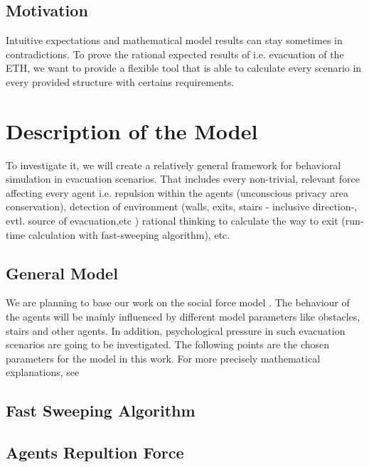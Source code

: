 \documentclass[11pt]{article}
\begin{document}
\subsection{Motivation}

Intuitive expectations and mathematical model results can stay sometimes in contradictions. To prove the rational expected results of i.e. evacuation of the ETH, we want to provide a flexible tool that is able to calculate every scenario in every provided structure with certains requirements.

\section{Description of the Model}


To investigate it, we will create a relatively general framework for behavioral simulation in evacuation scenarios. That includes every non-trivial, relevant force affecting every agent i.e. repulsion within the agents (unconscious privacy area conservation), detection of environment (walls, exits, stairs - inclusive direction-, evtl. source of evacuation,etc ) rational thinking to calculate the way to exit (run-time calculation with fast-sweeping algorithm), etc.


\subsection{General Model}

We are planning to base our work on the social force model \cite{SFMPD}. The  behaviour of the agents will be mainly influenced by different model parameters like obstacles, stairs and other agents. In addition, psychological pressure in such evacuation scenarios are going to be investigated. The following points are the chosen parameters for the model in this work. For more precisely mathematical explanations, see \cite{SFMPD}


\subsection*{Fast Sweeping Algorithm}

\subsection*{Agents Repultion Force}
\end{document}
